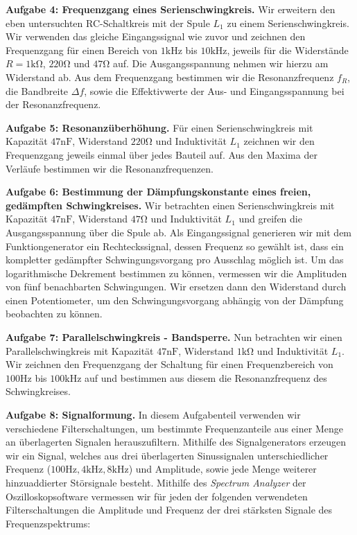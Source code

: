 \textbf{Aufgabe 4: Frequenzgang eines Serienschwingkreis.} Wir erweitern den eben untersuchten RC-Schaltkreis mit der Spule $L_1$ zu einem Serienschwingkreis. Wir verwenden das gleiche Eingangssignal wie zuvor und zeichnen den Frequenzgang für einen Bereich von $1 \si{\kilo\hertz}$ bis $10 \si{\kilo\hertz}$, jeweils für die Widerstände $R = 1 \si{\kilo\ohm}$, $220 \si{\ohm}$ und $47 \si{\ohm}$ auf. Die Ausgangsspannung nehmen wir hierzu am Widerstand ab. Aus dem Frequenzgang bestimmen wir die Resonanzfrequenz $f_R$, die Bandbreite $\Delta f$, sowie die Effektivwerte der Aus- und Eingangsspannung bei der Resonanzfrequenz.

\textbf{Aufgabe 5: Resonanzüberhöhung.} Für einen Serienschwingkreis mit Kapazität $47 \si{\nano\farad}$, Widerstand $220 \si{\ohm}$ und Induktivität $L_1$ zeichnen wir den Frequenzgang jeweils einmal über jedes Bauteil auf. Aus den Maxima der Verläufe bestimmen wir die Resonanzfrequenzen.

\textbf{Aufgabe 6: Bestimmung der Dämpfungskonstante eines freien, gedämpften Schwingkreises.} Wir betrachten einen Serienschwingkreis mit Kapazität $47 \si{\nano\farad}$, Widerstand $47 \si{\ohm}$ und Induktivität $L_1$ und greifen die Ausgangsspannung über die Spule ab. Als Eingangssignal generieren wir mit dem Funktiongenerator ein Rechteckssignal, dessen Frequenz so gewählt ist, dass ein kompletter gedämpfter Schwingungsvorgang pro Ausschlag möglich ist. Um das logarithmische Dekrement bestimmen zu können, vermessen wir die Amplituden von fünf benachbarten Schwingungen. Wir ersetzen dann den Widerstand durch einen Potentiometer, um den Schwingungsvorgang abhängig von der Dämpfung beobachten zu können.

\textbf{Aufgabe 7: Parallelschwingkreis - Bandsperre.} Nun betrachten wir einen Parallelschwingkreis mit Kapazität $47 \si{\nano\farad}$, Widerstand $1 \si{\kilo\ohm}$ und Induktivität $L_1$. Wir zeichnen den Frequenzgang der Schaltung für einen Frequenzbereich von $100 \si{\hertz}$ bis $100 \si{\kilo\hertz}$ auf und bestimmen aus diesem die Resonanzfrequenz des Schwingkreises.

\textbf{Aufgabe 8: Signalformung.} In diesem Aufgabenteil verwenden wir verschiedene Filterschaltungen, um bestimmte Frequenzanteile aus einer Menge an überlagerten Signalen herauszufiltern. Mithilfe des Signalgenerators erzeugen wir ein Signal, welches aus drei überlagerten Sinussignalen unterschiedlicher Frequenz ($100 \si{\hertz}, 4 \si{\kilo\hertz}, 8 \si{\kilo\hertz}$) und Amplitude, sowie jede Menge weiterer hinzuaddierter Störsignale besteht. Mithilfe des \textit{Spectrum Analyzer} der Oszilloskopsoftware vermessen wir für jeden der folgenden verwendeten Filterschaltungen die Amplitude und Frequenz der drei stärksten Signale des Frequenzspektrums:

